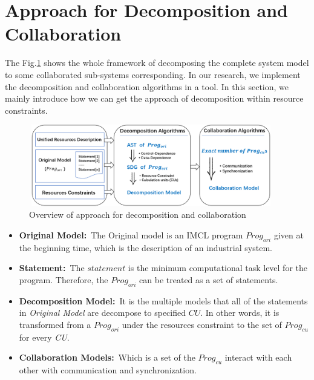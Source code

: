 \section{Approach for Decomposition and Collaboration} 
The Fig.\ref{fig_approach} shows the whole framework of decomposing the complete system model to some collaborated sub-systems corresponding. In our research, we implement the decomposition and collaboration algorithms in a tool. In this section, we mainly introduce how we can get the approach of decomposition within resource constraints.


\begin{figure}[!hpbt]
    \centering
        \includegraphics[height=1.4in, width=4.2in]{fig_Approach}
    \caption{Overview of approach for decomposition and collaboration }\label{fig_approach}
\end{figure}

\begin{itemize}
  \item \textbf{Original Model:}\  The Original model is an IMCL program $Prog_{ori}$ given at the beginning time, which is the description of an industrial system.
  \item \textbf{Statement:}\ The $statement$ is the minimum computational task level for the program. Therefore, the $Prog_{ori}$ can be treated as a set of statements.
  \item \textbf{Decomposition Model:}\  It is the multiple models that all of the statements in \emph{Original Model} are decompose to specified $CU$. In other words, it is transformed from a $Prog_{ori}$ under the resources constraint to the set of $Prog_{cu}$ for every \emph{CU}.
  \item \textbf{Collaboration Models:}\  Which is a set of the $Prog_{cu}$ interact with each other with communication and synchronization.
\end{itemize} 